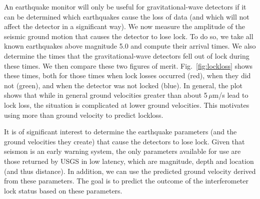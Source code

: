 \documentclass[reprint, prl, aps, showpacs]{revtex4-1}
\newcommand{\seismon}{\textnormal{seismon }}
\begin{document}
An earthquake monitor will only be useful for gravitational-wave detectors if it can be determined which earthquakes cause the loss of data (and which will not affect the detector in a significant way).
We now measure the amplitude of the seismic ground motion that causes the detector to lose lock. To do so, we take all known earthquakes above magnitude 5.0 and compute their arrival times. 
We also determine the times that the gravitational-wave detectors fell out of lock during these times. 
We then compare these two figures of merit. 
Fig.~\ref{fig:lockloss} shows these times, both for those times when lock losses occurred (red), when they did not (green), and when the detector was not locked (blue). 
In general, the plot shows that while in general ground velocities greater than about 5\,$\mu$m/s lead to lock loss, the situation is complicated at lower ground velocities. This motivates using more than ground velocity to predict lockloss.


It is of significant interest to determine the earthquake parameters (and the ground velocities they create) that cause the detectors to lose lock.
Given that \seismon is an early warning system, the only parameters available for use are those returned by USGS in low latency, which are magnitude, depth and location (and thus distance). 
In addition, we can use the predicted ground velocity derived from these parameters.
The goal is to predict the outcome of the interferometer lock status based on these parameters.
\end{document}

